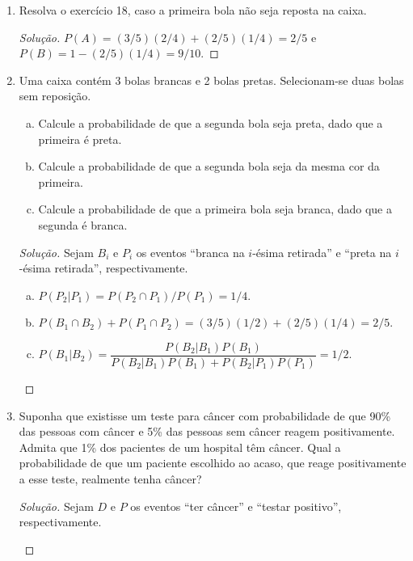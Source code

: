 \documentclass[../Notas.tex]{subfiles}
\begin{document}
\begin{enumerate}
\begin{proof}[Solução]
\begin{enumerate}[a)]
\[            \]
            \item $P(B) = 1 - (2/5)(2/5) = 21/25$.
        \end{enumerate}
    \end{proof}
    \item Resolva o exercício 18, caso a primeira bola não seja reposta na caixa.
    \begin{proof}[Solução]
        $P(A) = (3/5)(2/4) + (2/5)(1/4) = 2/5$ e $P(B) = 1 - (2/5)(1/4) = 9/10$.
    \end{proof}
    \item Uma caixa contém 3 bolas brancas e 2 bolas pretas. Selecionam-se duas bolas sem reposição.
    \begin{enumerate}[a)]
    \item Calcule a probabilidade de que a segunda bola seja preta, dado que a primeira é preta.
    \item Calcule a probabilidade de que a segunda bola seja da mesma cor da primeira.
    \item Calcule a probabilidade de que a primeira bola seja branca, dado que a segunda é branca.
    \end{enumerate}
    \begin{proof}[Solução]
        Sejam $B_i$ e $P_i$ os eventos ``branca na $i$-ésima retirada'' e ``preta na $i$-ésima retirada'',
        respectivamente.
        \begin{enumerate}[a)]
            \item $P(P_2|P_1) = P(P_2\cap P_1)/P(P_1) = 1/4$.
            \item $P(B_1 \cap B_2) + P(P_1 \cap P_2) = (3/5)(1/2) + (2/5)(1/4) = 2/5$.
            \item $P(B_1|B_2) = \dfrac{P(B_2|B_1)P(B_1)}{P(B_2|B_1)P(B_1) + P(B_2|P_1)P(P_1)} = 1/2$.
        \end{enumerate}
    \end{proof}
    \item Suponha que existisse um teste para câncer com probabilidade de que 90\% das pessoas com câncer e 5\% das pessoas sem câncer reagem positivamente. Admita que 1\% dos pacientes de um hospital têm câncer. Qual a probabilidade de que um paciente escolhido ao acaso, que reage positivamente a esse teste, realmente tenha câncer?
    \begin{proof}[Solução]
        Sejam $D$ e $P$ os eventos ``ter câncer'' e ``testar positivo'', respectivamente.
        \begin{enumerate}[a)]

\end{enumerate}
\end{proof}
\end{enumerate}
\end{document}
